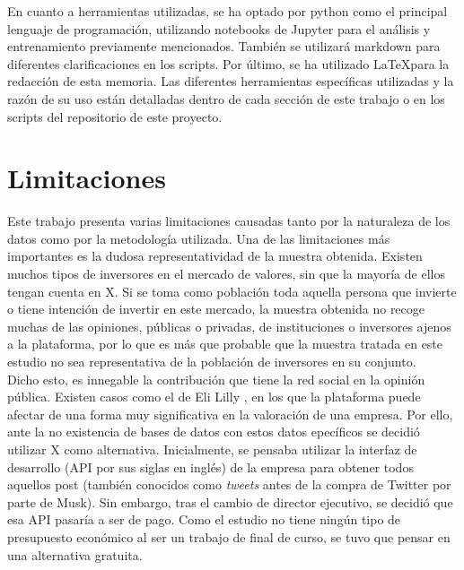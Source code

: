 \documentclass[a4paper, 12pt]{report}
\begin{document}
                En cuanto a herramientas utilizadas, se ha optado por python como el principal lenguaje de programación, 
                utilizando notebooks de Jupyter para el análisis y entrenamiento previamente mencionados. También se utilizará
                markdown para diferentes clarificaciones en los scripts. Por último, se ha utilizado \LaTeX para la redacción de esta memoria. Las 
                diferentes herramientas específicas utilizadas y la razón de su uso están detalladas dentro de cada sección de este trabajo o en 
                los scripts del repositorio de este proyecto.\\

        \section{Limitaciones}

                Este trabajo presenta varias limitaciones causadas tanto por la naturaleza de los datos como por la metodología utilizada.
                Una de las limitaciones más importantes es la dudosa representatividad de la muestra obtenida. Existen muchos tipos de inversores en el mercado de valores,
                sin que la mayoría de ellos tengan cuenta en X. Si se toma como población toda aquella persona que invierte o tiene intención de invertir en este mercado,
                la muestra obtenida no recoge muchas de las opiniones, públicas o privadas, de instituciones o inversores ajenos a la plataforma, por lo que es más que probable 
                que la muestra tratada en este estudio no sea representativa de la población de inversores en su conjunto.\\

                Dicho esto, es innegable la contribución que tiene la red social en la opinión pública. Existen casos como el de Eli Lilly \cite{BBCNewsMundo}, en los que la plataforma puede afectar de una
                forma muy significativa en la valoración de una empresa. Por ello, ante la no existencia de bases de datos con estos datos epecíficos se decidió utilizar X como 
                alternativa. Inicialmente, se pensaba utilizar la interfaz de desarrollo (API por sus siglas en inglés) de la empresa para obtener todos aquellos post (también conocidos como \textit{tweets} antes de la compra de Twitter por parte de Musk). Sin embargo,
                tras el cambio de director ejecutivo, se decidió que esa API pasaría a ser de pago. Como el estudio no tiene ningún tipo de presupuesto económico al ser un trabajo de final de curso,
                se tuvo que pensar en una alternativa gratuita.\\
\end{document}
